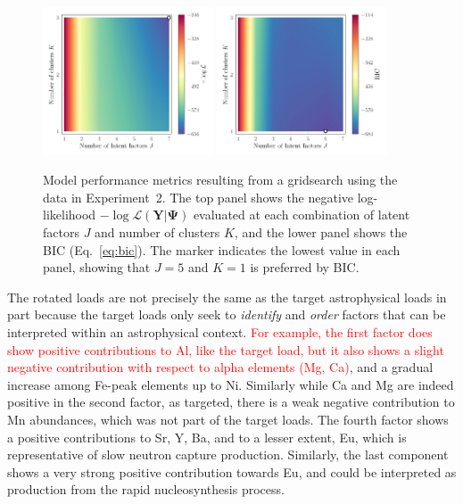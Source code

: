\documentclass[twocolumn]{aastex62}
\newcommand{\todo}[1]{\textcolor{red}{#1}}
\newcommand{\vect}[1]{\boldsymbol{\mathbf{#1}}}
\renewcommand{\vec}[1]{\vect{#1}}
\newcommand{\data}{\textbf{Y}}
\newcommand{\scorecovs}{\vec\Omega}
\newcommand{\NumLatentFactors}{J}
\newcommand{\NumComponents}{K}
\begin{document}
\begin{figure}
	\includegraphics[width=0.45\textwidth]{experiments/exp2-gridsearch-ll.pdf}
	\includegraphics[width=0.45\textwidth]{experiments/exp2-gridsearch-bic.pdf}
    \caption{Model performance metrics resulting from a gridsearch using the
    		 \citet{Barklem:2005} data in Experiment~2.
    		 The top panel shows the negative log-likelihood 
			 $-\log{\mathcal{L}\left(\data|\vec\Psi\right)}$ 
			 evaluated at each combination of latent factors $\NumLatentFactors$ and number 
			 of clusters $\NumComponents$, and the lower panel shows the BIC (Eq.~\ref{eq:bic}).
			 The marker indicates the lowest value in each panel, showing that
			 $\NumLatentFactors = 5$ and $\NumComponents = 1$ is preferred by BIC.}
    \label{fig:exp2-gridsearch-contours}
\end{figure}


The rotated loads are not precisely the same as the target astrophysical loads
in part because the target loads only seek to \emph{identify} and \emph{order}
factors that can be interpreted within an astrophysical context. 
\todo{For example,
the first factor does show positive contributions to Al, like the target load,
but it also shows a slight negative contribution with respect to alpha elements
(Mg, Ca)}, and a gradual increase among Fe-peak elements up to Ni. Similarly while
Ca and Mg are indeed positive in the second factor, as targeted, there is a
weak negative contribution to Mn abundances, which was not part of the target
loads. The fourth factor shows a positive contributions to Sr, Y, Ba, and to a
lesser extent, Eu, which is representative of slow neutron capture production.
Similarly, the last component shows a very strong positive contribution towards
Eu, and could be interpreted as production from the rapid nucleosynthesis process.
\end{document}

